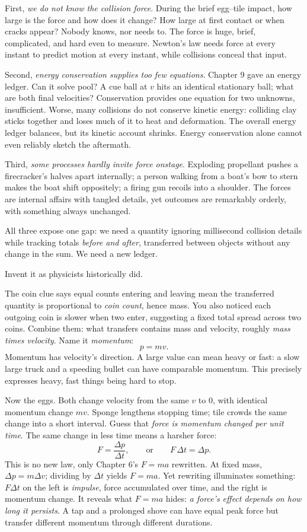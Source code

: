 First, \emph{we do not know the collision force}. During the brief egg--tile impact, how large is the force and how does it change? How large at first contact or when cracks appear? Nobody knows, nor needs to. The force is huge, brief, complicated, and hard even to measure. Newton's law needs force at every instant to predict motion at every instant, while collisions conceal that input.

Second, \emph{energy conservation supplies too few equations}. Chapter 9 gave an energy ledger. Can it solve pool? A cue ball at \(v\) hits an identical stationary ball; what are both final velocities? Conservation provides one equation for two unknowns, insufficient. Worse, many collisions do not conserve kinetic energy: colliding clay sticks together and loses much of it to heat and deformation. The overall energy ledger balances, but its kinetic account shrinks. Energy conservation alone cannot even reliably sketch the aftermath.

Third, \emph{some processes hardly invite force onstage}. Exploding propellant pushes a firecracker's halves apart internally; a person walking from a boat's bow to stern makes the boat shift oppositely; a firing gun recoils into a shoulder. The forces are internal affairs with tangled details, yet outcomes are remarkably orderly, with something always unchanged.

All three expose one gap: we need a quantity ignoring millisecond collision details while tracking totals \emph{before and after}, transferred between objects without any change in the sum. We need a new ledger.


Invent it as physicists historically did.

The coin clue says equal counts entering and leaving mean the transferred quantity is proportional to \emph{coin count}, hence mass. You also noticed each outgoing coin is slower when two enter, suggesting a fixed total spread across two coins. Combine them: what transfers contains mass and velocity, roughly \emph{mass times velocity}. Name it \emph{momentum}:
\[
p=mv .
\]
Momentum has velocity's direction. A large value can mean heavy or fast: a slow large truck and a speeding bullet can have comparable momentum. This precisely expresses heavy, fast things being hard to stop.

Now the eggs. Both change velocity from the same \(v\) to \(0\), with identical momentum change \(mv\). Sponge lengthens stopping time; tile crowds the same change into a short interval. Guess that \emph{force is momentum changed per unit time}. The same change in less time means a harsher force:
\[
F=\frac{\Delta p}{\Delta t},\qquad\text{or}\qquad F\,\Delta t=\Delta p .
\]
This is no new law, only Chapter 6's \(F=ma\) rewritten. At fixed mass, \(\Delta p=m\Delta v\); dividing by \(\Delta t\) yields \(F=ma\). Yet rewriting illuminates something: \(F\Delta t\) on the left is \emph{impulse}, force accumulated over time, and the right is momentum change. It reveals what \(F=ma\) hides: \emph{a force's effect depends on how long it persists}. A tap and a prolonged shove can have equal peak force but transfer different momentum through different durations.

